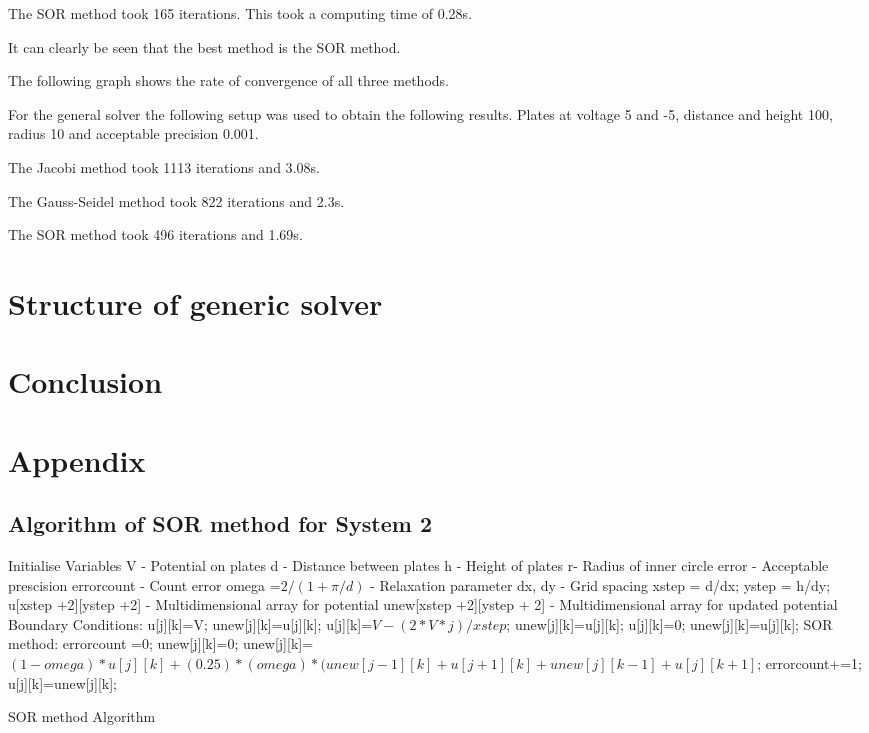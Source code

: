 \documentclass{article}
\begin{document}
The SOR method took 165 iterations. This took a computing time of 0.28s.

It can clearly be seen that the best method is the SOR method. 

The following graph shows the rate of convergence of all three methods.

For the general solver the following setup was used to obtain the following results. Plates at voltage 5 and -5, distance and height 100, radius 10 and acceptable precision 0.001. 

The Jacobi method took 1113 iterations and 3.08s.

The Gauss-Seidel method took 822 iterations and 2.3s.

The SOR method took 496 iterations and 1.69s. 


\section{Structure of generic solver}

\section{Conclusion}


\section{Appendix}
\subsection{Algorithm of SOR method for System 2}
\begin{algorithm}
\begin{algorithmic}
\State Initialise Variables
\State V - Potential on plates
\State d - Distance between plates
\State h - Height of plates
\State r- Radius of inner circle
\State error - Acceptable prescision
\State errorcount - Count error
\State omega =$ 2/(1+ \pi/d)$ - Relaxation parameter
\State dx, dy - Grid spacing
\State xstep = d/dx;
\State ystep = h/dy;
\State u[xstep +2][ystep +2] - Multidimensional array for potential
\State unew[xstep +2][ystep + 2] - Multidimensional array for updated potential
\State Boundary Conditions:
\State u[j][k]=V;
\State unew[j][k]=u[j][k];
\State u[j][k]=$V-(2*V*j)/xstep$;
\State unew[j][k]=u[j][k];
\Else
\State u[j][k]=0;
\State unew[j][k]=u[j][k];
\EndIf
\EndFor
\EndFor
\State SOR method:
\State errorcount =0;
\State unew[j][k]=0;
\Else 
\State unew[j][k]=$(1-omega)*u[j][k]+(0.25)*(omega)*(unew[j-1][k]+u[j+1][k] + unew[j][k-1] + u[j][k+1]$;
\EndIf
\EndFor
\EndFor
{}
\State errorcount+=1;
\EndIf
\EndFor
{}
\State u[j][k]=unew[j][k];
\EndFor
\EndFor
\EndWhile
\caption{SOR method Algorithm}
\EndProcedure
\end{algorithmic}
\end{algorithm}
\end{document}
